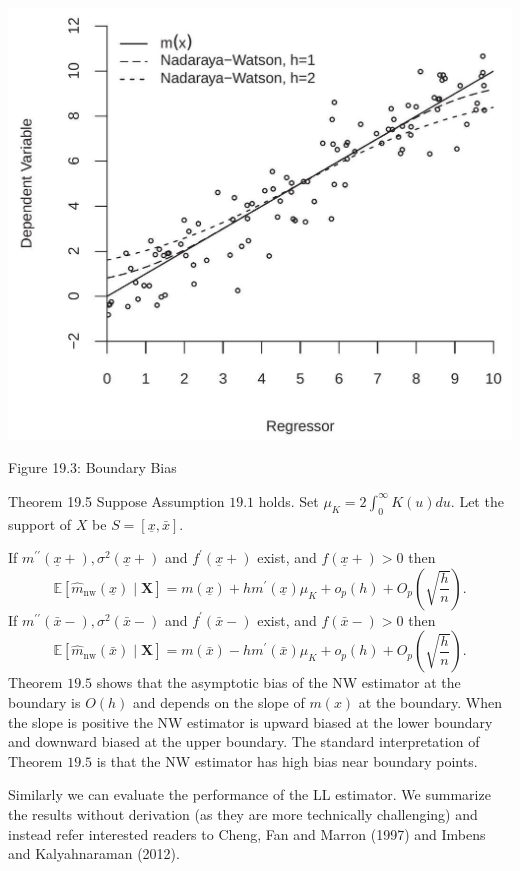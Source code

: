 \documentclass[10pt]{article}
\begin{document}
\includegraphics[max width=\textwidth]{2022_10_23_027876b875523fa3ea56g-13}

Figure 19.3: Boundary Bias

Theorem 19.5 Suppose Assumption $19.1$ holds. Set $\mu_{K}=2 \int_{0}^{\infty} K(u) d u$. Let the support of $X$ be $S=[\underline{x}, \bar{x}]$.

If $m^{\prime \prime}(\underline{x}+), \sigma^{2}(\underline{x}+)$ and $f^{\prime}(\underline{x}+)$ exist, and $f(\underline{x}+)>0$ then
$$
\mathbb{E}\left[\hat{m}_{\mathrm{nw}}(\underline{x}) \mid \boldsymbol{X}\right]=m(\underline{x})+h m^{\prime}(\underline{x}) \mu_{K}+o_{p}(h)+O_{p}\left(\sqrt{\frac{h}{n}}\right) .
$$
If $m^{\prime \prime}(\bar{x}-), \sigma^{2}(\bar{x}-)$ and $f^{\prime}(\bar{x}-)$ exist, and $f(\bar{x}-)>0$ then
$$
\mathbb{E}\left[\widehat{m}_{\mathrm{nw}}(\bar{x}) \mid \boldsymbol{X}\right]=m(\bar{x})-h m^{\prime}(\bar{x}) \mu_{K}+o_{p}(h)+O_{p}\left(\sqrt{\frac{h}{n}}\right) .
$$
Theorem $19.5$ shows that the asymptotic bias of the NW estimator at the boundary is $O(h)$ and depends on the slope of $m(x)$ at the boundary. When the slope is positive the NW estimator is upward biased at the lower boundary and downward biased at the upper boundary. The standard interpretation of Theorem $19.5$ is that the NW estimator has high bias near boundary points.

Similarly we can evaluate the performance of the LL estimator. We summarize the results without derivation (as they are more technically challenging) and instead refer interested readers to Cheng, Fan and Marron (1997) and Imbens and Kalyahnaraman (2012).
\end{document}
